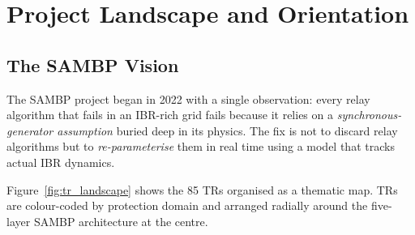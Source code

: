 \documentclass[11pt,a4paper]{report}
\newcommand{\sambp}{\textsc{SAMBP}}
\newcommand{\ibr}{\textsc{IBR}}
\begin{document}
\chapter{Project Landscape and Orientation}
\label{ch:landscape}

\section{The SAMBP Vision}

The \sambp{} project began in 2022 with a single observation: every relay algorithm that fails in an \ibr{}-rich grid fails because it relies on a \emph{synchronous-generator assumption} buried deep in its physics. The fix is not to discard relay algorithms but to \emph{re-parameterise} them in real time using a model that tracks actual \ibr{} dynamics.

Figure~\ref{fig:tr_landscape} shows the 85 TRs organised as a thematic map. TRs are colour-coded by protection domain and arranged radially around the five-layer \sambp{} architecture at the centre.
\end{document}
